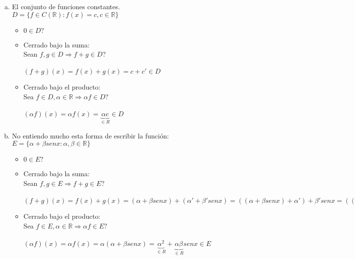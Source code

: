 \documentclass{article}
\begin{document}
\begin{enumerate}[a.]
\begin{itemize}
			\item
				$0 \in C?$
			\item
				Cerrado bajo la suma: \\
				Sean $f,g \in C \Rightarrow f+g \in C$ \\ \\
				$(f+g)(2) = f(2) + g(2) = 0 + 0 = 0 \in C$
			\item
				Cerrado bajo el producto: \\
				Sea $f \in C, \alpha \in \mathbb{R} \Rightarrow \alpha f \in C?$ \\ \\
				$(\alpha f)(2) = \alpha f(2) = \alpha 0 = 0 \in C$
		\end{itemize}
	\item
		El conjunto de funciones constantes. \\
		$D = \{ f \in C(\mathbb{R}) : f(x) = c, c \in \mathbb{R}\}$
		\begin{itemize}
			\item
				$0 \in D?$
			\item
				Cerrado bajo la suma: \\
				Sean $f,g \in D \Rightarrow f+g \in D?$ \\ \\
				$(f+g)(x) = f(x) + g(x) = c + c' \in D$
			\item
				Cerrado bajo el producto: \\
				Sea $f \in D, \alpha \in \mathbb{R} \Rightarrow \alpha f \in D?$ \\ \\
				$(\alpha f)(x) = \alpha f(x) = \underbrace{\alpha c}_{\in R} \in D$
		\end{itemize}
	\item
		No entiendo mucho esta forma de escribir la función: \\
		$E = \{ \alpha + \beta sen x: \alpha, \beta \in \mathbb{R}\}$
		\begin{itemize}
			\item
				$0 \in E?$
			\item
				Cerrado bajo la suma: \\
				Sean $f,g \in E \Rightarrow f+g \in E?$ \\ \\
				$(f+g)(x) = f(x) + g(x) = (\alpha + \beta sen x) + (\alpha' + \beta' sen x) = ((\alpha + \beta senx)+\alpha')+\beta' senx =
				((\alpha + \alpha') + \beta senx) + \beta' senx = (\alpha + \alpha') + \beta senx + \beta' senx = (\alpha + \alpha') +
				(\beta + \beta') senx $
 			\item
 				Cerrado bajo el producto: \\
 				Sea $f \in E, \alpha \in \mathbb{R} \Rightarrow \alpha f \in E?$ \\ \\
 				$(\alpha f)(x) = \alpha f(x) = \alpha (\alpha + \beta senx) = \underbrace{\alpha^2}_{\in R} + \underbrace{\alpha\beta}_{\in R} senx \in E$
		\end{itemize}
\end{enumerate}
\end{document}
